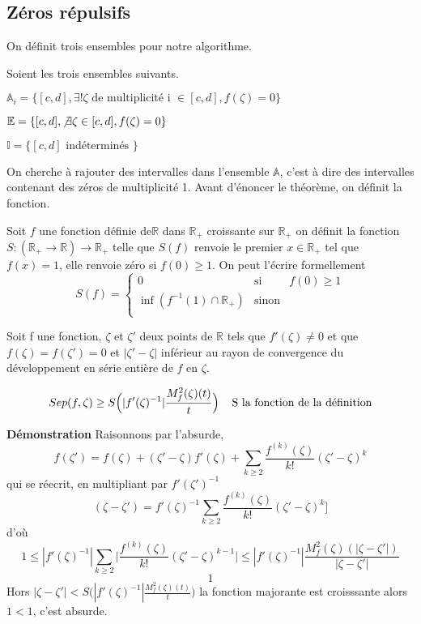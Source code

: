 \documentclass[a4paper,10.5pt]{article}
\begin{document}
	\subsection{Zéros répulsifs}
	On définit trois ensembles pour notre algorithme.
	\begin{definition} Soient les trois ensembles suivants.
		
	$\mathbb{A}_i=\{[c,d], \exists ! \zeta \text{ de multiplicité i } \in [c,d], f(\zeta)=0\}$
	
	$\mathbb{E}=\{[c,d], \not\exists \zeta \in [c,d], f(\zeta)=0\}$
	
	$\mathbb{I}=\{[c,d] \text{ indéterminés }\}$\\
	\end{definition}

	\noindent On cherche à rajouter des intervalles dans l'ensemble $\mathbb{A}$, c'est à dire des intervalles contenant des zéros  de multiplicité 1.
	Avant d'énoncer le théorème, on définit la fonction. 
	\begin{definition} Soit $f$ une fonction définie de$\mathbb{R}$ dans $\mathbb{R}_+$ croissante sur $\mathbb{R}_+$ on définit la fonction $S:(\mathbb{R}_+ \rightarrow \mathbb{R}) \longrightarrow \mathbb{R}_+$  telle que $S(f)$ renvoie le premier $x \in \mathbb{R}_+$ tel que $f(x)=1$, elle renvoie zéro si $f(0) \geq1$. On  peut l'écrire formellement
		\begin{equation}
		S(f)=
		\left\lbrace
		\begin{array}{ccc}
		0  & \mbox{si} & f(0) \geq 1\\
		\inf (f^{-1}(1)\cap \mathbb{R}_{+}) & \mbox{sinon}\\
		\end{array}\right.
		\end{equation}
	\end{definition}
	\begin{theorem}	Soit f une fonction, $\zeta$ et $\zeta '$ deux points de $\mathbb{R}$ tels que $f'(\zeta)\neq 0$ et que $f(\zeta)=f(\zeta ')=0$ et $|\zeta '-\zeta|$ inférieur au rayon de convergence du développement en série entière de $f$ en $\zeta$. 
		
		\[Sep(f,\zeta) \geq S\Big(|f'(\zeta)^{-1}|\frac{M_{f}^{2}(\zeta)(t)}{t}\Big) \hspace{4mm} \text{S la fonction de la définition} \]
	\end{theorem}

	\noindent \textbf{Démonstration} Raisonnons par l'absurde, 
	\[f(\zeta ')=f(\zeta)+(\zeta '-\zeta)f'(\zeta)+ \sum_{k \geq 2}\frac{f^{(k)}(\zeta)}{k!}(\zeta'-\zeta)^k\]
	qui se réecrit, en multipliant par $f'(\zeta ')^{-1}$
	\[(\zeta-\zeta')=f'(\zeta)^{-1} \sum_{k \geq 2}\frac{f^{(k)}(\zeta)}{k!}(\zeta'-\zeta)^k]\]
	d'où 
	\[1 \leq |f'(\zeta)^{-1}|\sum_{k \geq 2}  \big|\frac{f^{(k)}(\zeta)}{k!}(\zeta'-\zeta)^{k-1} \big|\leq |f'(\zeta)^{-1}| \frac{M_{f}^{2}(\zeta)(|\zeta-\zeta'|)}{|\zeta-\zeta'|}\]
	\[1 \]
	Hors $|\zeta-\zeta'|<S\Big(|f'(\zeta)^{-1}|\frac{M_{f}^{2}(\zeta)(t)}{t}\Big)$ la fonction majorante est croisssante alors $1<1$, c'est absurde.
	
\end{document}

